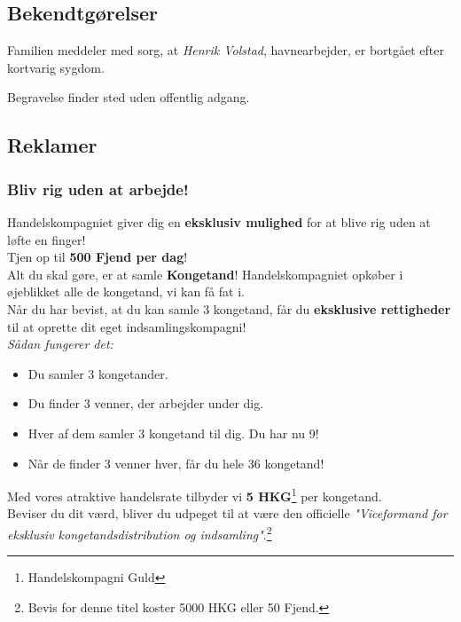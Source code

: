 \documentclass[letterpaper,12pt]{memoir}
\begin{document}
\subsection*{Bekendtgørelser}

Familien meddeler med sorg, at
\textit{Henrik Volstad}, havnearbejder,
er bortgået efter kortvarig sygdom.

Begravelse finder sted uden offentlig adgang.


\subsection*{Reklamer}

\subsubsection*{Bliv rig uden at arbejde!}

Handelskompagniet giver dig en \textbf{eksklusiv mulighed} for at blive rig uden at løfte en finger! \\[0.5em]

Tjen op til \textbf{500 Fjend per dag}! \\[0.5em]

Alt du skal gøre, er at samle \textbf{Kongetand}! Handelskompagniet opkøber i øjeblikket alle de kongetand, vi kan få fat i. \\[0.5em]

Når du har bevist, at du kan samle 3 kongetand, får du \textbf{eksklusive rettigheder} til at oprette dit eget indsamlingskompagni! \\[1em]

\textit{Sådan fungerer det:}
\begin{itemize}
  \item Du samler 3 kongetander.
  \item Du finder 3 venner, der arbejder under dig.
  \item Hver af dem samler 3 kongetand til dig. Du har nu 9!
  \item Når de finder 3 venner hver, får du hele 36 kongetand!
\end{itemize}

Med vores atraktive handelsrate tilbyder vi \textbf{5 HKG}\footnote{Handelskompagni Guld} per kongetand. \\[0.5em]

Beviser du dit værd, bliver du udpeget til at være den officielle \textit{"Viceformand for eksklusiv kongetandsdistribution og indsamling"}.\footnote{Bevis for denne titel koster 5000 HKG eller 50 Fjend.} \\[1em]
\end{document}
